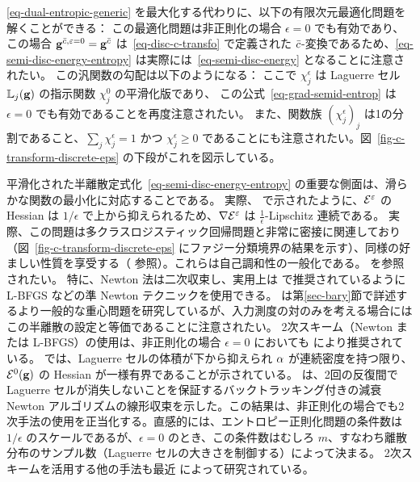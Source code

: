 \eqref{eq-dual-entropic-generic} を最大化する代わりに、以下の有限次元最適化問題を解くことができる：
この最適化問題は非正則化の場合 $\epsilon=0$ でも有効であり、この場合 $\mathrm{\textbf{g}}^{\bar{c},\varepsilon=0}=\mathrm{\textbf{g}}^{\bar{c}}$ は~\eqref{eq-disc-c-transfo} で定義された $\bar {c}$-変換であるため、\eqref{eq-semi-disc-energy-entropy} は実際には~\eqref{eq-semi-disc-energy} となることに注意されたい。
この汎関数の勾配は以下のようになる：
ここで $\chi_j^\epsilon$ は Laguerre セル $\mathbb{L}_{j}(\mathrm{\textbf{g}})$ の指示関数 $\chi_j^0$ の平滑化版であり、
この公式~\eqref{eq-grad-semid-entrop} は $\epsilon=0$ でも有効であることを再度注意されたい。
また、関数族 $( \chi_j^\epsilon )_j$ は1の分割であること、\ie $\sum_j \chi_j^\epsilon=1$ かつ $\chi_j^\epsilon \geq 0$ であることにも注意されたい。図~\ref{fig-c-transform-discrete-eps} の下段がこれを図示している。

\begin{rem}[2次手法とロジスティック回帰との関係]\label{rem-second-order-smoothness}
	平滑化された半離散定式化~\eqref{eq-semi-disc-energy-entropy} の重要な側面は、滑らかな関数の最小化に対応することである。
	実際、\citep{genevay2016stochastic} で示されたように、$\mathcal{E}^\varepsilon$ の Hessian は $1/\epsilon$ で上から抑えられるため、$\nabla \mathcal{E}^\varepsilon$ は $\frac{1}{\epsilon}$-Lipschitz 連続である。
	実際、この問題は多クラスロジスティック回帰問題と非常に密接に関連しており（図~\ref{fig-c-transform-discrete-eps} にファジー分類境界の結果を示す）、同様の好ましい性質を享受する（\citep{hosmer2013applied} 参照）。これらは自己調和性の一般化である。\citep{bach2010self} を参照されたい。
	特に、Newton 法は二次収束し、実用上は \citep{2016-Cuturi-siims} で推奨されているように L-BFGS などの準 Newton テクニックを使用できる。\citep{2016-Cuturi-siims} は第\ref{sec-bary}節で詳述するより一般的な重心問題を研究しているが、入力測度の対のみを考える場合にはこの半離散の設定と等価であることに注意されたい。
	2次スキーム（Newton または L-BFGS）の使用は、非正則化の場合 $\epsilon=0$ においても \citep{Merigot11,de2012blue,levy2015numerical} により推奨されている。\citep[Theo. 5.1]{kitagawa2016newton} では、Laguerre セルの体積が下から抑えられ $\alpha$ が連続密度を持つ限り、$\mathcal{E}^0(\mathrm{\textbf{g}})$ の Hessian が一様有界であることが示されている。\citeauthor{kitagawa2016newton} は、2回の反復間で Laguerre セルが消失しないことを保証するバックトラッキング付きの減衰 Newton アルゴリズムの線形収束を示した。この結果は、非正則化の場合でも2次手法の使用を正当化する。直感的には、エントロピー正則化問題の条件数は $1/\epsilon$ のスケールであるが、$\epsilon=0$ のとき、この条件数はむしろ $m$、すなわち離散分布のサンプル数（Laguerre セルの大きさを制御する）によって決まる。
	2次スキームを活用する他の手法も最近 \citep{knight2013fast,sugiyama2017tensor,cohen2017matrix,allen2017much} によって研究されている。
\end{rem}




